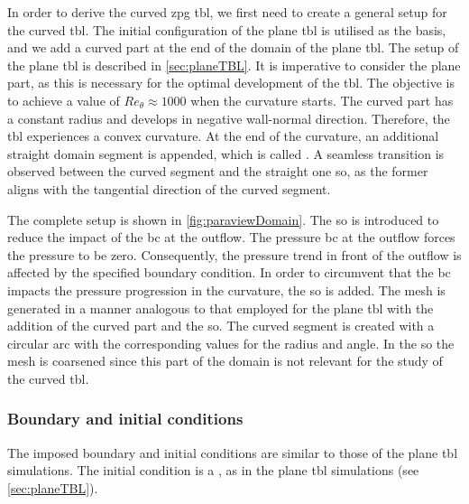 In order to derive the curved \acrshort{zpg} \acrshort{tbl}, we first need to create a general setup for the curved \acrshort{tbl}. 
The initial configuration of the plane  \acrshort{tbl} is utilised as the basis, and we add a curved part at the end of the domain of the plane \acrshort{tbl}. 
The setup of the plane \acrshort{tbl} is described in \autoref{sec:planeTBL}.
It is imperative to consider the plane part, as this is necessary for the optimal development of the \acrshort{tbl}. The objective is to achieve
a value of $Re_{\theta} \approx 1000$ when the curvature starts. 
The curved part has a constant radius and develops in negative wall-normal direction. 
Therefore, the \acrshort{tbl} experiences a convex curvature. 
At the end of the curvature, an additional straight domain segment is appended, which is called .
A seamless transition is observed between the curved segment and the straight one \acrlong{so}, as the former aligns with the tangential direction of the curved segment. 

The complete setup is shown in \autoref{fig:paraviewDomain}.
The \acrlong{so} is introduced to reduce the impact of the \acrlong{bc} at the outflow. 
The pressure \acrshort{bc} at the outflow forces the pressure to be zero.
Consequently, the pressure trend in front of the outflow is affected by the specified boundary condition.
In order to circumvent  that the \acrshort{bc} impacts the pressure progression in the curvature, the \acrlong{so} is added.
The mesh is generated in a manner analogous to that employed for the plane  \acrshort{tbl} with the addition of the curved part and the \acrlong{so}.
The curved segment is created with a circular arc with the corresponding values for the radius and angle.
In the \acrlong{so} the mesh is coarsened since this part of the domain is not relevant for the study of the curved \acrshort{tbl}. \\

\subsubsection{Boundary and initial conditions}
The imposed boundary and initial conditions are similar to those of the plane \acrshort{tbl} simulations.
The initial condition is a , as in the plane \acrshort{tbl} simulations (see \autoref{sec:planeTBL}).

